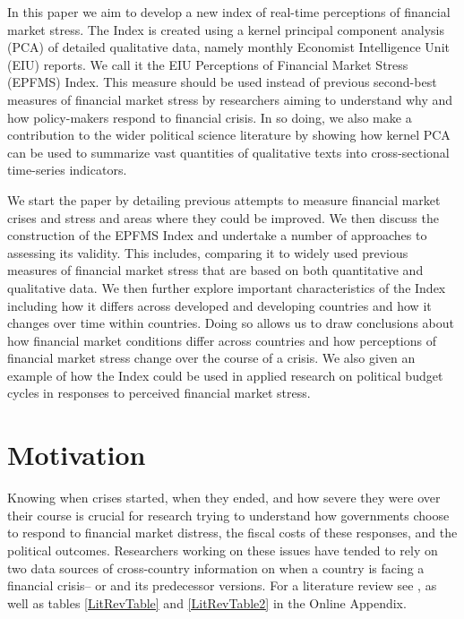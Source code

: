 \documentclass[]{article}
\begin{document}
In this paper we aim to develop a new index
of real-time perceptions of financial market stress. The Index is
created using a kernel principal component analysis (PCA) of detailed qualitative data, namely monthly Economist Intelligence Unit (EIU) reports. We call it the EIU Perceptions of
Financial Market Stress (EPFMS) Index. This measure should be used instead of
previous second-best measures of financial market stress by researchers
aiming to understand why and how policy-makers respond to financial
crisis. In so doing, we also make a contribution to the wider political
science literature by showing how kernel PCA can be used to summarize
vast quantities of qualitative texts into cross-sectional time-series
indicators.

We start the paper by detailing previous attempts to measure financial market crises and stress and areas where they could be improved. We then discuss the
construction of the EPFMS Index and undertake a number of approaches to assessing its validity. This includes, comparing it to widely used previous measures of financial market stress that are based on both quantitative and qualitative data. We then further explore important characteristics of the Index including how it differs across developed and developing countries and how it changes over time within countries. Doing so allows us to draw conclusions about how financial market conditions differ across countries and how perceptions of financial market stress change over the course of a crisis. We also given an example of how the Index could be used in applied research on political budget cycles in responses to perceived financial market stress.

\section{Motivation}\label{motivation}

Knowing when crises started, when they ended, and how severe they were over their course is crucial for research trying to understand how governments choose to respond to financial market distress, the fiscal costs of these responses, and the political outcomes. Researchers working on these issues have tended to rely on two data sources of cross-country information on when a country is facing a financial crisis--\cite{Reinhart2009,ReinhartRog2010} or \cite{laeven2013} and its predecessor versions. For a literature review see \cite{GandrudHallerberg2015}, as well as tables \ref{LitRevTable} and \ref{LitRevTable2} in the Online Appendix.
\end{document}
